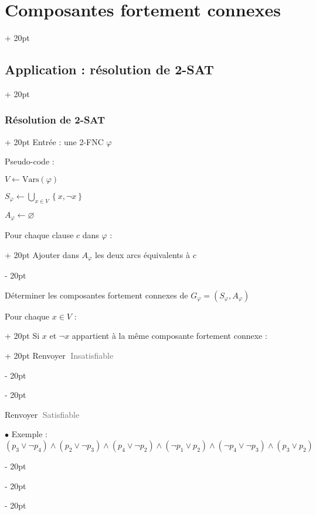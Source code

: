 \documentclass[a4paper, 12pt, twoside]{article}
\newcommand{\set}[1]{\left\{ #1 \right\}}
\newcommand{\simplecit}[1]{\guillemotleft$\;$#1$\;$\guillemotright}
\newcommand{\cit}[1]{\simplecit{\textcolor{656565}{#1}}}
\newcommand{\ind}[1][20pt]{\advance\leftskip + #1}
\newcommand{\deind}[1][20pt]{\advance\leftskip - #1}
\newenvironment{indt}[2][20pt]{#2 \par \ind[#1]}{\par \deind} %
\begin{document}
\begin{indt}{\section{Composantes fortement connexes}}
\begin{indt}{\subsection{Application : résolution de 2-SAT}}
\begin{indt}{\subsubsection{Résolution de 2-SAT}}
                Entrée : une 2-FNC $\varphi$

                Pseudo-code :
                \begin{pseudocode}
                    $V \leftarrow \mathrm{Vars}(\varphi)$

                    $\displaystyle S_\varphi \leftarrow \bigcup_{x \in V} \set{x, \neg x}$

                    $A_\varphi \leftarrow \varnothing$

                    \vspace{6pt}
                    
                    \begin{indt}{Pour chaque clause $c$ dans $\varphi$ :}
                        Ajouter dans $A_\varphi$ les deux arcs équivalents à $c$
                    \end{indt}

                    \vspace{6pt}
                    
                    Déterminer les composantes fortement connexes de $G_\varphi = (S_\varphi, A_\varphi)$

                    \vspace{6pt}
                    
                    \begin{indt}{Pour chaque $x \in V$ :}
                        \begin{indt}{Si $x$ et $\neg x$ appartient à la même composante fortement connexe :}
                            Renvoyer \cit{Insatisfiable}
                        \end{indt}
                    \end{indt}

                    \vspace{6pt}
                    
                    Renvoyer \cit{Satisfiable}
                \end{pseudocode}

                \vspace{12pt}
                
                $\bullet$ Exemple :
                \[
                    (p_3 \vee \neg p_4) \wedge (p_2 \vee \neg p_3) \wedge (p_4 \vee \neg p_2) \wedge (\neg p_1 \vee p_2) \wedge (\neg p_4 \vee \neg p_3) \wedge (p_3 \vee p_2)
                \]

                \begin{center}
\end{center}
\end{indt}
\end{indt}
\end{indt}
\end{document}
